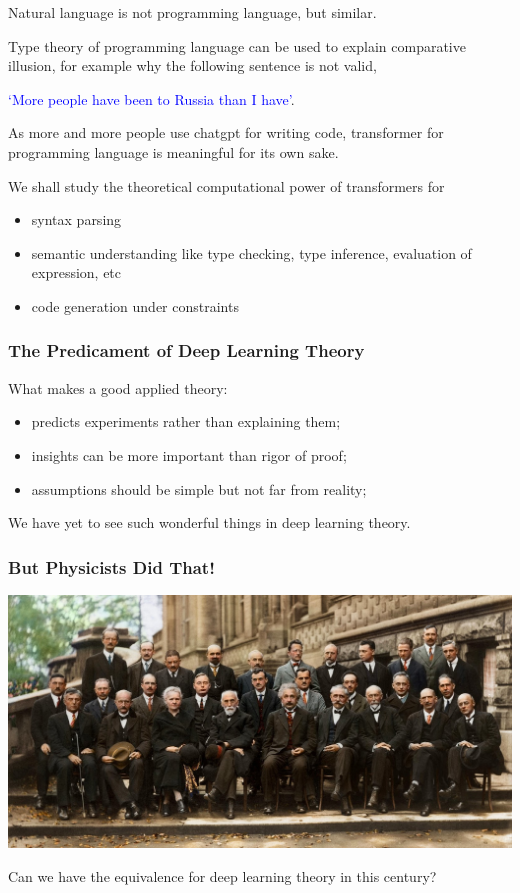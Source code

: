 \documentclass{beamer}   	%
\theoremstyle{definition}
\begin{document}
\begin{frame}
Natural language is not programming language, but similar.

Type theory of programming language can be used to explain comparative illusion, for example why the following sentence is not valid,


	\textcolor{blue}{`More people have been to Russia than I have'}.

As more and more people use chatgpt for writing code, transformer for programming language is meaningful for its own sake.

We shall study the theoretical computational power of transformers for
\begin{itemize}
	\item syntax parsing
	\item semantic understanding like type checking, type inference, evaluation of expression, etc
	\item code generation under constraints
\end{itemize}
\end{frame}

\begin{frame}
\frametitle{The Predicament of Deep Learning Theory}
What makes a good applied theory:
\begin{itemize}
	\item predicts experiments rather than explaining them;
	\item insights can be more important than rigor of proof;
	\item assumptions should be simple but not far from reality;
\end{itemize}

We have yet to see such wonderful things in deep learning theory.
\end{frame}

\begin{frame}
\frametitle{But Physicists Did That!}
\includegraphics[width=\linewidth]{physicists.jpg}

Can we have the equivalence for deep learning theory in this century?
\end{frame}
\end{document}
